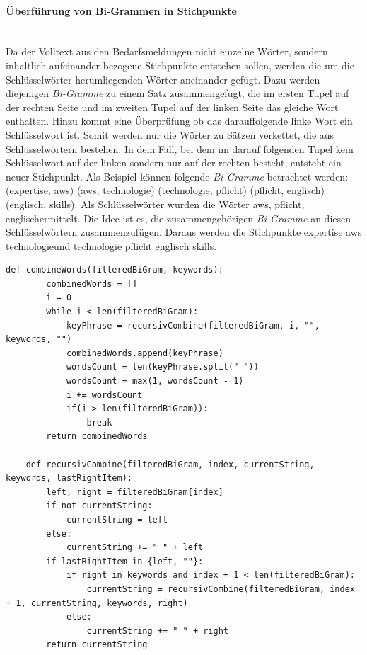 \paragraph{Überführung von Bi-Grammen in Stichpunkte}\mbox{}\\
\label{par:stichpunkte}
Da der Volltext aus den Bedarfsmeldungen nicht einzelne Wörter, sondern inhaltlich aufeinander bezogene Stichpunkte entstehen sollen, werden die um die Schlüsselwörter herumliegenden Wörter aneinander gefügt. Dazu werden diejenigen \emph{Bi-Gramme} zu einem Satz zusammengefügt, die im ersten Tupel auf der rechten Seite und im zweiten Tupel auf der linken Seite das gleiche Wort enthalten. Hinzu kommt eine Überprüfung ob das darauffolgende linke Wort ein Schlüsselwort ist. Somit werden nur die Wörter zu Sätzen verkettet, die aus Schlüsselwörtern bestehen. In dem Fall, bei dem im darauf folgenden Tupel kein Schlüsselwort auf der linken sondern nur auf der rechten besteht, entsteht ein neuer Stichpunkt. Als Beispiel können folgende \emph{Bi-Gramme} betrachtet werden: (\grqq expertise\grqq, \grqq aws\grqq) (\grqq aws\grqq, \grqq technologie\grqq) (\grqq technologie\grqq, \grqq pflicht\grqq) (\grqq pflicht\grqq, \grqq englisch\grqq) (\grqq englisch\grqq, \grqq skills\grqq). Als Schlüsselwörter wurden die Wörter \grqq aws\grqq, \grqq pflicht\grqq, \grqq englisch\grqq ermittelt. Die Idee ist es, die zusammengehörigen \emph{Bi-Gramme} an diesen Schlüsselwörtern zusammenzufügen. Daraus werden die Stichpunkte \grqq expertise aws technologie\grqq und \grqq technologie pflicht englisch skills\grqq.
\begin{lstlisting}[caption={Umformung der Bi-Gramm Liste in Stichpunkte}, label=lst:stichpunkte]
	def combineWords(filteredBiGram, keywords):
		combinedWords = []
		i = 0
		while i < len(filteredBiGram):
			keyPhrase = recursivCombine(filteredBiGram, i, "", keywords, "")
			combinedWords.append(keyPhrase)
			wordsCount = len(keyPhrase.split(" "))
			wordsCount = max(1, wordsCount - 1)
			i += wordsCount
			if(i > len(filteredBiGram)):
				break
		return combinedWords
	
	def recursivCombine(filteredBiGram, index, currentString, keywords, lastRightItem):
		left, right = filteredBiGram[index]
		if not currentString:
			currentString = left
		else:
			currentString += " " + left
		if lastRightItem in {left, ""}:
			if right in keywords and index + 1 < len(filteredBiGram):
				currentString = recursivCombine(filteredBiGram, index + 1, currentString, keywords, right)
			else:
				currentString += " " + right
		return currentString
\end{lstlisting}
